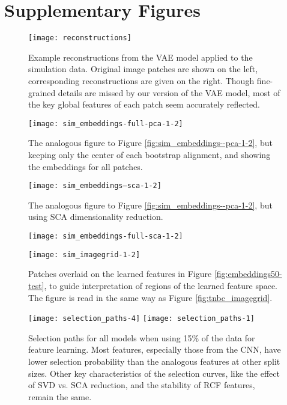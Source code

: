 \section{Supplementary Figures}

\begin{figure}
\texttt{[image: reconstructions]}
\caption{Example reconstructions from the VAE model applied to the simulation
  data. Original image patches are shown on the left, corresponding
  reconstructions are given on the right. Though fine-grained details are missed
  by our version of the VAE model, most of the key global features of each patch
  seem accurately reflected.}
\label{fig:reconstructions}
\end{figure}

\begin{figure}
  \centering
  \texttt{[image: sim\_embeddings-full-pca-1-2]}
  \caption{The analogous figure to Figure \ref{fig:sim_embeddings--pca-1-2}, but
    keeping only the center of each bootstrap alignment, and showing the
    embeddings for all patches.}
  \label{fig:sim_embeddings-full-pca-1-2}
\end{figure}

\begin{figure}
  \centering
  \texttt{[image: sim\_embeddings--sca-1-2]}
  \caption{The analogous figure to Figure \ref{fig:sim_embeddings--pca-1-2}, but
    using SCA dimensionality reduction.}
  \label{fig:sim_embeddings--sca-1-2}
\end{figure}

\begin{figure}
  \centering
  \texttt{[image: sim\_embeddings-full-sca-1-2]}
  \caption{}
  \label{sim_embeddings-full-sca-1-2}
\end{figure}

\begin{figure}
  \centering
  \texttt{[image: sim\_imagegrid-1-2]}
  \caption{Patches overlaid on the learned features in Figure
    \ref{fig:embeddings50-test}, to guide interpretation of regions of the
    learned feature space. The figure is read in the same way as Figure
    \ref{fig:tnbc_imagegrid}.}
  \label{fig:sim_imagegrid-1-2}
\end{figure}

\begin{figure}
  \centering
  \texttt{[image: selection\_paths-4]}
  \texttt{[image: selection\_paths-1]}
  \caption{Selection paths for all models when using 15\% of the data for
    feature learning. Most features, especially those from the CNN, have lower selection
    probability than the analogous features at other split sizes. Other key
    characteristics of the selection curves, like the effect of SVD vs. SCA
    reduction, and the stability of RCF features, remain the same.}
  \label{fig:selection_paths15}
\end{figure}

